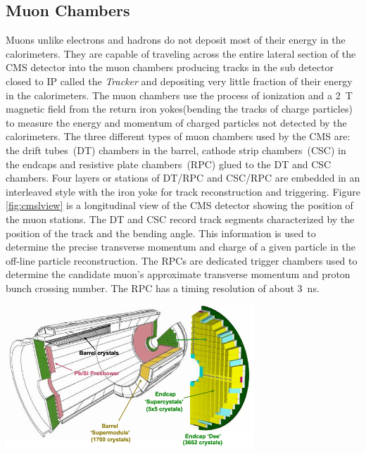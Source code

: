 \subsection{Muon Chambers}
Muons unlike electrons and hadrons do not deposit most of their energy in the calorimeters.
They are capable of traveling across the entire lateral section of the CMS detector into the muon chambers producing tracks in the 
sub detector closed to IP called the \textit{Tracker} and depositing very little fraction of their energy in the calorimeters. 
The muon chambers use the process of ionization and a 2~T magnetic field from the return iron yokes(bending the tracks of charge particles) to measure the energy and momentum of charged particles not detected by the calorimeters.
The three different types of muon chambers used by the CMS are: the drift tubes~(DT) chambers in the barrel, cathode strip chambers~(CSC) 
in the endcaps and resistive plate chambers~(RPC) glued to the DT and CSC chambers.
Four layers or stations of DT/RPC and CSC/RPC are embedded in an interleaved  style with the iron yoke for track reconstruction and triggering. Figure \ref{fig:cmslview} is a longitudinal view of the CMS detector showing the position of the muon stations.
The DT and CSC record track segments characterized by the position of the track and the bending angle. This information is used to determine the precise transverse momentum and charge of a given particle in the  off-line particle reconstruction.
The RPCs are dedicated trigger chambers used to determine the candidate muon's approximate transverse momentum and proton bunch crossing number. The RPC has a timing resolution of about 3~ns.
\clearpage
\begin{center}
\centering
\mbox{\includegraphics[height= 0.5\textwidth, width=0.7\textwidth]{THESISPLOTS/CMS-ECAL-EB-EE.png}}
\label{fig:CMSECAL}
\end{center}


